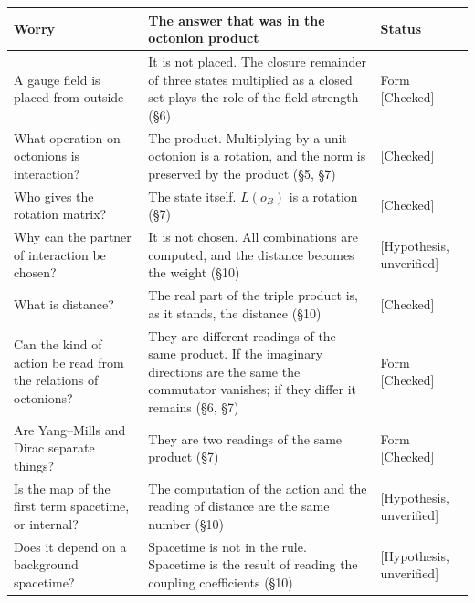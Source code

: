 \documentclass[
  a4paper,
]{article}
\newcounter{none} %
\begin{document}
{\def\LTcaptype{none} %
\begin{longtable}[]{@{}
  >{\raggedright\arraybackslash}p{}
  >{\raggedright\arraybackslash}p{}
  >{\raggedright\arraybackslash}p{}@{}}
\toprule\noalign{}
\begin{minipage}[b]{\linewidth}\raggedright
Worry
\end{minipage} & \begin{minipage}[b]{\linewidth}\raggedright
The answer that was in the octonion product
\end{minipage} & \begin{minipage}[b]{\linewidth}\raggedright
Status
\end{minipage} \\
\midrule\noalign{}
\endhead
\bottomrule\noalign{}
\endlastfoot
A gauge field is placed from outside & It is not placed. The closure
remainder of three states multiplied as a closed set plays the role of
the field strength (§6) & Form {[}Checked{]} \\
What operation on octonions is interaction? & The product. Multiplying
by a unit octonion is a rotation, and the norm is preserved by the
product (§5, §7) & {[}Checked{]} \\
Who gives the rotation matrix? & The state itself. \(L(o_B)\) is a
rotation (§7) & {[}Checked{]} \\
Why can the partner of interaction be chosen? & It is not chosen. All
combinations are computed, and the distance becomes the weight (§10) &
{[}Hypothesis, unverified{]} \\
What is distance? & The real part of the triple product is, as it
stands, the distance (§10) & {[}Checked{]} \\
Can the kind of action be read from the relations of octonions? & They
are different readings of the same product. If the imaginary directions
are the same the commutator vanishes; if they differ it remains (§6, §7)
& Form {[}Checked{]} \\
Are Yang--Mills and Dirac separate things? & They are two readings of
the same product (§7) & Form {[}Checked{]} \\
Is the map of the first term spacetime, or internal? & The computation
of the action and the reading of distance are the same number (§10) &
{[}Hypothesis, unverified{]} \\
Does it depend on a background spacetime? & Spacetime is not in the
rule. Spacetime is the result of reading the coupling coefficients (§10)
& {[}Hypothesis, unverified{]} \\
\end{longtable}
}
\end{document}
